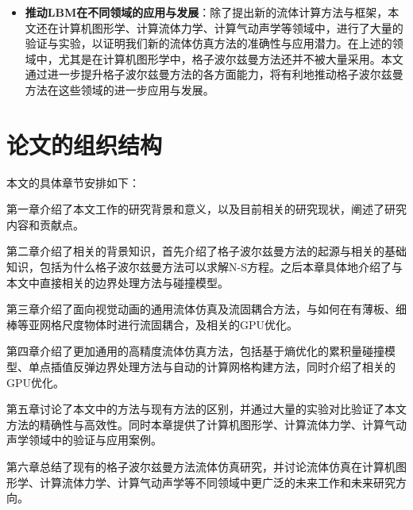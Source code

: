 \begin{itemize}
    \item \textbf{推动LBM在不同领域的应用与发展}：除了提出新的流体计算方法与框架，本文还在计算机图形学、计算流体力学、计算气动声学等领域中，进行了大量的验证与实验，以证明我们新的流体仿真方法的准确性与应用潜力。在上述的领域中，尤其是在计算机图形学中，格子波尔兹曼方法还并不被大量采用。本文通过进一步提升格子波尔兹曼方法的各方面能力，将有利地推动格子波尔兹曼方法在这些领域的进一步应用与发展。
\end{itemize}

\section{论文的组织结构}
本文的具体章节安排如下：

第一章介绍了本文工作的研究背景和意义，以及目前相关的研究现状，阐述了研究内容和贡献点。

第二章介绍了相关的背景知识，首先介绍了格子波尔兹曼方法的起源与相关的基础知识，包括为什么格子波尔兹曼方法可以求解N-S方程。之后本章具体地介绍了与本文中直接相关的边界处理方法与碰撞模型。

第三章介绍了面向视觉动画的通用流体仿真及流固耦合方法，与如何在有薄板、细棒等亚网格尺度物体时进行流固耦合，及相关的GPU优化。

第四章介绍了更加通用的高精度流体仿真方法，包括基于熵优化的累积量碰撞模型、单点插值反弹边界处理方法与自动的计算网格构建方法，同时介绍了相关的GPU优化。

第五章讨论了本文中的方法与现有方法的区别，并通过大量的实验对比验证了本文方法的精确性与高效性。同时本章提供了计算机图形学、计算流体力学、计算气动声学领域中的验证与应用案例。

第六章总结了现有的格子波尔兹曼方法流体仿真研究，并讨论流体仿真在计算机图形学、计算流体力学、计算气动声学等不同领域中更广泛的未来工作和未来研究方向。